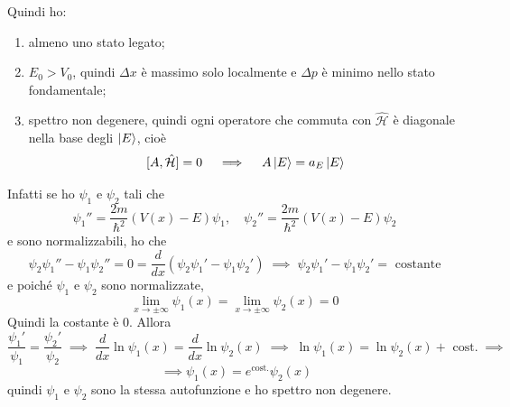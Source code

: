 \bigskip
\noindent
Quindi ho:
\begin{enumerate}
\item almeno uno stato legato;
\item \( E_0 > V_0 \), quindi \(\Delta x\) è massimo solo localmente e \(\Delta p\) è minimo nello stato fondamentale;
\item spettro non degenere, quindi ogni operatore che commuta con \( \hat{\mathcal{H}} \) è diagonale nella base degli \( \ket{E} \), cioè 
\[
[A, \hat{\mathcal{H}}] = 0 \quad \implies \quad A \ket{E} = a_E \ket{E}
\]
\end{enumerate}
Infatti se ho \( \psi_1 \) e \( \psi_2 \) tali che
\[
\psi_1'' = \frac{2m}{\hbar^2} \left( V(x) - E \right) \psi_1, \quad \psi_2'' = \frac{2m}{\hbar^2} \left( V(x) - E \right) \psi_2
\]
e sono normalizzabili, ho che
\[
\psi_2 \psi_1'' - \psi_1 \psi_2'' = 0 = \frac{d}{dx} (\psi_2 \psi_1' - \psi_1 \psi_2') \; \implies \; \psi_2 \psi_1' - \psi_1 \psi_2' = \text{ costante}
\]
e poiché \( \psi_1 \) e \( \psi_2 \) sono normalizzate,
\[
\lim_{x \to \pm \infty} \psi_1(x) = \lim_{x \to \pm \infty} \psi_2(x) = 0
\]
Quindi la costante è 0. Allora 
\[
\frac{\psi_1'}{\psi_1} = \frac{\psi_2'}{\psi_2} \; \implies \; \frac{d}{dx} \ln \psi_1(x) = \frac{d}{dx} \ln \psi_2(x) \; \implies \; \ln \psi_1(x) = \ln \psi_2(x) + \text{ cost.} \; \implies
\]
\[
\; \implies \psi_1(x) = e^{\text{cost.}} \psi_2(x)
\]
quindi \( \psi_1 \) e \( \psi_2 \) sono la stessa autofunzione e ho spettro non degenere.